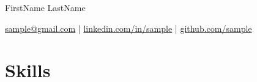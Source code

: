                        

% 





\centerline{\Huge FirstName LastName}

\vspace{5pt}

\centerline{\href{mailto:sample@gmail.com}{sample@gmail.com} | \href{https://www.linkedin.com/in/sample/}{linkedin.com/in/sample} | \href{https://github.com/sample}{github.com/sample}}

\vspace{-10pt}

\section*{Skills}
\label{skillsSection}


